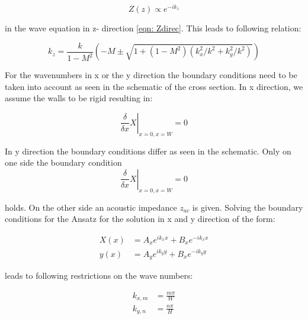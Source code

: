 \documentclass[11pt]{report} %
\begin{document}
\begin{equation}
Z(z)\propto e^{-ik_z}
\end{equation}  

in the wave equation in z- direction \ref{eqn: Zdirec}.
This leads to following relation:

\begin{equation}\label{eqn: Impdet2}
    k_z = \frac{k}{1-M^2} \left( -M \pm \sqrt{1+(1-M^2)(k_x^2/k^2 + k_y^2/k^2)}\right)    
\end{equation}

For the wavenumbers in x or the y direction the boundary conditions need to be taken into account as seen in the schematic of the cross section.
In x direction, we assume the walls to be rigid resulting in:
 
\begin{equation}
\left.\frac{\delta}{\delta x}X\right\rvert_{x=0,x=W}=0
\end{equation}

In y direction the boundary conditions differ as seen in the schematic. 
Only on one side the boundary condition 
\begin{equation}
\left.\frac{\delta}{\delta x}X\right\rvert_{x=0,x=W}=0
\end{equation}

holds.
On the other side an acoustic impedance $z_{ac}$ is given.
Solving the boundary conditions for the Ansatz for the solution in x and y direction of the form: 

\begin{subequations}
\begin{align}
X(x)&=A_xe^{ik_xx}+B_xe^{-ik_xx}\\
y(x)&=A_ye^{ik_yy}+B_xe^{-ik_yy}
\end{align}
\end{subequations}
 
leads to following restrictions on the wave numbers: 

\begin{subequations}
\begin{align}
k_{x,m}&=\frac{m\pi}{W}\\
k_{y,n}&=\frac{n\pi}{H}
\end{align}
\end{subequations}
\end{document}
